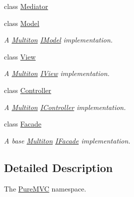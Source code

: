 \begin{DoxyCompactItemize}
\item 
class \hyperlink{class_pure_m_v_c_1_1_mediator}{Mediator}
\item 
class \hyperlink{class_pure_m_v_c_1_1_model}{Model}
\begin{DoxyCompactList}\small\item\em A \hyperlink{class_pure_m_v_c_1_1_multiton}{Multiton} {\ttfamily \hyperlink{class_pure_m_v_c_1_1_i_model}{IModel}} implementation. \item\end{DoxyCompactList}\item 
class \hyperlink{class_pure_m_v_c_1_1_view}{View}
\begin{DoxyCompactList}\small\item\em A \hyperlink{class_pure_m_v_c_1_1_multiton}{Multiton} {\ttfamily \hyperlink{class_pure_m_v_c_1_1_i_view}{IView}} implementation. \item\end{DoxyCompactList}\item 
class \hyperlink{class_pure_m_v_c_1_1_controller}{Controller}
\begin{DoxyCompactList}\small\item\em A \hyperlink{class_pure_m_v_c_1_1_multiton}{Multiton} {\ttfamily \hyperlink{class_pure_m_v_c_1_1_i_controller}{IController}} implementation. \item\end{DoxyCompactList}\item 
class \hyperlink{class_pure_m_v_c_1_1_facade}{Facade}
\begin{DoxyCompactList}\small\item\em A base \hyperlink{class_pure_m_v_c_1_1_multiton}{Multiton} {\ttfamily \hyperlink{class_pure_m_v_c_1_1_i_facade}{IFacade}} implementation. \item\end{DoxyCompactList}\end{DoxyCompactItemize}


\subsection{Detailed Description}
The \hyperlink{namespace_pure_m_v_c}{PureMVC} namespace. 